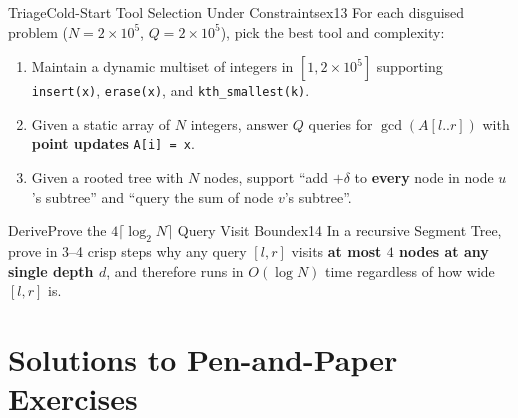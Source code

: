 \documentclass[11pt,a4paper]{article}
\theoremstyle{definition}
\begin{document}
\begin{tryitbox}{Triage}{Cold-Start Tool Selection Under Constraints}{ex13}
For each disguised problem ($N = 2 \times 10^5$, $Q = 2 \times 10^5$), pick the best tool and complexity:
\begin{enumerate}[itemsep=2pt, topsep=2pt]
    \item Maintain a dynamic multiset of integers in $[1, 2 \times 10^5]$ supporting \texttt{insert(x)}, \texttt{erase(x)}, and \texttt{kth\_smallest(k)}.
    \item Given a static array of $N$ integers, answer $Q$ queries for $\gcd(A[l..r])$ with \textbf{point updates} \texttt{A[i] = x}.
    \item Given a rooted tree with $N$ nodes, support ``add $+\delta$ to \textbf{every} node in node $u$'s subtree'' and ``query the sum of node $v$'s subtree''.
\end{enumerate}
\end{tryitbox}

\begin{tryitbox}{Derive}{Prove the $4\lceil \log_2 N \rceil$ Query Visit Bound}{ex14}
In a recursive Segment Tree, prove in 3--4 crisp steps why any query $[l, r]$ visits \textbf{at most $4$ nodes at any single depth $d$}, and therefore runs in $O(\log N)$ time regardless of how wide $[l, r]$ is.
\end{tryitbox}

\section*{Solutions to Pen-and-Paper Exercises}
\end{document}
